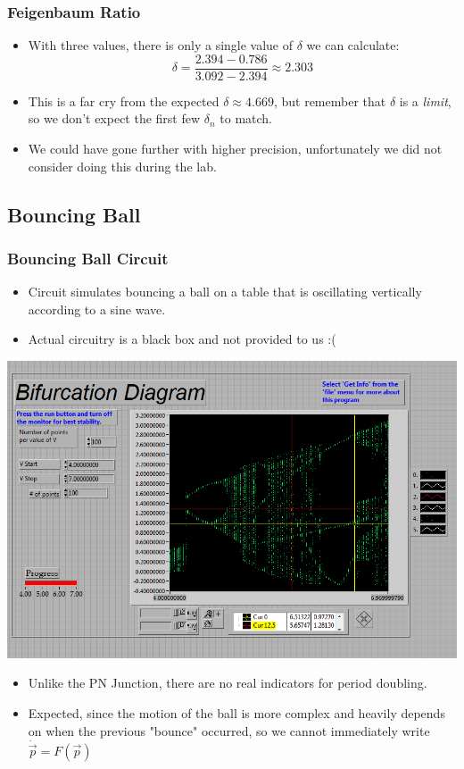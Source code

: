 \documentclass[9pt]{beamer}
\begin{document}
\begin{frame}
	\frametitle{Feigenbaum Ratio}
	\begin{itemize}
		\item With three values, there is only a single value of \( \delta \) we can
			calculate:
			\[
				\delta = \frac{2.394 - 0.786}{3.092 - 2.394} \approx 2.303
			\]
		\item This is a far cry from the expected \( \delta \approx 4.669 \), but
			remember that \( \delta  \) is a \textit{limit}, so we don't expect the
			first few \( \delta_n \) to match. 
		\item We could have gone further with higher precision, unfortunately we did
			not consider doing this during the lab.  
	\end{itemize}
\end{frame}

\subsection{Bouncing Ball}
\begin{frame}
	\frametitle{Bouncing Ball Circuit}
	\begin{itemize}
		\item Circuit simulates bouncing a ball on a table that is oscillating vertically
			according to a sine wave. 
		\item Actual circuitry is a black box and not provided to us :(  
	\end{itemize}
	\begin{center}
		\includegraphics[scale=0.3]{images/BB_Bifr_4V-7V.PNG}
	\end{center}
	\begin{itemize}
		\item Unlike the PN Junction, there are no real indicators for period
			doubling. 
		\item Expected, since the motion of the ball is more complex and heavily
			depends on when the previous "bounce" occurred, so we cannot immediately
			write \( \dot{\vec p} = F(\vec p) \)
	\end{itemize}
\end{frame}
\end{document}
